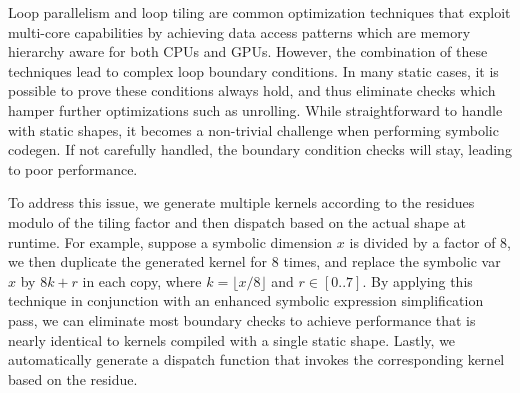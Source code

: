 %



Loop parallelism and loop tiling are common optimization techniques that exploit multi-core capabilities by achieving data access patterns which
  are memory hierarchy aware for both CPUs and GPUs. However, the combination of these techniques lead to complex loop boundary conditions.
In many static cases, it is possible to prove these conditions always hold, and thus eliminate checks which hamper further optimizations such as unrolling.
While straightforward to handle with static shapes, it becomes a non-trivial challenge when performing symbolic codegen.
If not carefully handled, the boundary condition checks will stay, leading to poor performance.

To address this issue, we generate multiple kernels according to the residues modulo of the tiling
  factor and then dispatch based on the actual shape at runtime.
For example, suppose a symbolic dimension $x$ is divided by a factor of 8, we then duplicate the generated kernel
  for 8 times, and replace the symbolic var $x$ by $8k+r$ in each copy, where $k = \lfloor x / 8 \rfloor$ and $r \in [0..7]$.
By applying this technique in conjunction with an enhanced symbolic expression simplification pass,
  we can eliminate most boundary checks to achieve performance that is nearly identical
  to kernels compiled with a single static shape.
Lastly, we automatically generate a dispatch function that invokes the corresponding kernel based on the residue.

